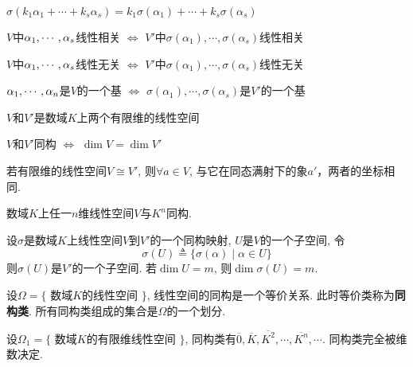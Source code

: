 \begin{Property}
$\sigma(k_1 \alpha_1 + \cdots + k_s \alpha_s) = k_1 \sigma(\alpha_1) + \cdots + k_s \sigma (\alpha_s)$
\end{Property}

\begin{Property}
$V$中$\alpha_{1}, \cdots, \alpha_{s}$线性相关 $\iff$ $V'$中$\sigma(\alpha_1), \cdots, \sigma(\alpha_s)$线性相关
\end{Property}

\begin{Property}
$V$中$\alpha_{1}, \cdots, \alpha_{s}$线性无关 $\iff$ $V'$中$\sigma(\alpha_1), \cdots, \sigma(\alpha_s)$线性无关
\end{Property}

\begin{Property}
$\alpha_{1}, \cdots, \alpha_{n}$是$V$的一个基 $\iff$ $\sigma(\alpha_1), \cdots, \sigma(\alpha_s)$是$V'$的一个基
\end{Property}

\begin{thm}
$V$和$V'$是数域$K$上两个有限维的线性空间
\begin{tightcenter}
$V$和$V'$同构 $\iff$ $\dim V = \dim V'$
\end{tightcenter}
\end{thm}

\begin{Note}
若有限维的线性空间$V \cong V'$, 则$\forall a \in V$, 与它在同态满射下的象$a'$，两者的坐标相同.
\end{Note}

\begin{Corollary}
数域$K$上任一$n$维线性空间$V$与$K^n$同构.
\end{Corollary}

\begin{Proposition}
设$\sigma$是数域$K$上线性空间$V$到$V'$的一个同构映射, $U$是$V$的一个子空间, 令
$$
\sigma(U) \triangleq \{ \sigma(\alpha) \mid \alpha \in U \}
$$
则$\sigma(U)$是$V'$的一个子空间. 若$\dim U = m$, 则$\dim \sigma(U) = m$. 
\end{Proposition}

\begin{Note}
设$\Omega = \{$ 数域$K$的线性空间 $\}$, 线性空间的同构是一个等价关系.
此时等价类称为\textbf{同构类}. 所有同构类组成的集合是$\Omega$的一个划分.
\end{Note}

\begin{Note}
设$\Omega_1 = \{$ 数域$K$的有限维线性空间 $\}$, 同构类有$\overline{0}, \overline{K}, \overline{K^2}, \cdots, \overline{K^n}, \cdots$.
同构类完全被维数决定.
\end{Note}

